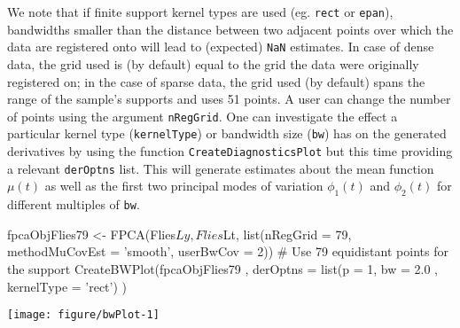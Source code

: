 \documentclass[11pt,english]{article}\usepackage[]{graphicx}\usepackage[]{color}
\makeatletter
\def\maxwidth{ %
  \ifdim\Gin@nat@width>\linewidth
    \linewidth
  \else
    \Gin@nat@width
  \fi
}
\makeatother
\begin{document}
We note that if finite support kernel types are used (eg. \texttt{rect} or \texttt{epan}), bandwidths smaller than the distance between two adjacent points over which the data are registered onto will lead to (expected) \texttt{NaN} estimates. In case of dense data, the grid used is (by default) equal to the grid the data were originally registered on; in the case of sparse data, the grid used (by default) spans the range of the sample's supports and uses 51 points. A user can change the number of points using the argument \texttt{nRegGrid}.  
One can investigate the effect a particular kernel type (\texttt{kernelType}) or bandwidth size (\texttt{bw}) has on the generated derivatives by using the function \texttt{CreateDiagnosticsPlot} but this time providing a relevant \texttt{derOptns} list. This will generate estimates about the mean function $\mu(t)$ as well as the first two principal modes of variation $\phi_1(t)$ and $\phi_2(t)$ for different multiples of \texttt{bw}. 

\begin{Schunk}
\begin{Sinput}
fpcaObjFlies79 <- FPCA(Flies$Ly, Flies$Lt, list(nRegGrid = 79, methodMuCovEst = 'smooth', userBwCov = 2)) # Use 79 equidistant points for the support
CreateBWPlot(fpcaObjFlies79 , derOptns = list(p = 1, bw = 2.0 , kernelType = 'rect') )
\end{Sinput}


{\centering \texttt{[image: figure/bwPlot-1]} 

}

\end{Schunk}




%
\end{document}
